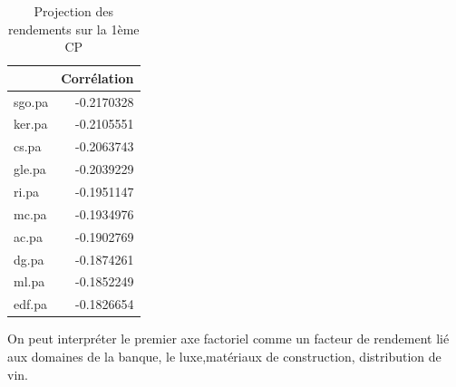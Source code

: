 \documentclass[
]{article}
\begin{document}
\begin{table}

\caption{\label{tab:unnamed-chunk-1}Projection des rendements sur la 1ème CP}
\centering
\begin{tabular}[t]{lr}
\toprule
  & Corrélation\\
\midrule
sgo.pa & -0.2170328\\
ker.pa & -0.2105551\\
cs.pa & -0.2063743\\
gle.pa & -0.2039229\\
ri.pa & -0.1951147\\
\addlinespace
mc.pa & -0.1934976\\
ac.pa & -0.1902769\\
dg.pa & -0.1874261\\
ml.pa & -0.1852249\\
edf.pa & -0.1826654\\
\bottomrule
\end{tabular}
\end{table}

On peut interpréter le premier axe factoriel comme un facteur de
rendement lié aux domaines de la banque, le luxe,matériaux de
construction, distribution de vin.
\end{document}
